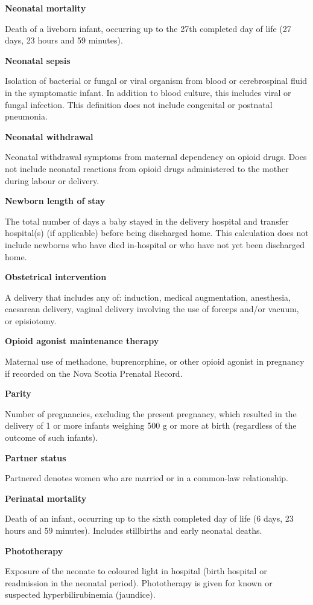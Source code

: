 \documentclass[
]{krantz}
\begin{document}
\textbf{Neonatal mortality}

Death of a liveborn infant, occurring up to the 27th completed day of life (27 days, 23 hours and 59 minutes).

\textbf{Neonatal sepsis}

Isolation of bacterial or fungal or viral organism from blood or cerebrospinal fluid in the symptomatic infant. In addition to blood culture, this includes viral or fungal infection. This definition does not include congenital or postnatal pneumonia.

\textbf{Neonatal withdrawal}

Neonatal withdrawal symptoms from maternal dependency on opioid drugs. Does not include neonatal reactions from opioid drugs administered to the mother during labour or delivery.

\textbf{Newborn length of stay}

The total number of days a baby stayed in the delivery hospital and transfer hospital(s) (if applicable) before being discharged home. This calculation does not include newborns who have died in-hospital or who have not yet been discharged home.

\textbf{Obstetrical intervention}

A delivery that includes any of: induction, medical augmentation, anesthesia, caesarean delivery, vaginal delivery involving the use of forceps and/or vacuum, or episiotomy.

\textbf{Opioid agonist maintenance therapy}

Maternal use of methadone, buprenorphine, or other opioid agonist in pregnancy if recorded on the Nova Scotia Prenatal Record.

\textbf{Parity}

Number of pregnancies, excluding the present pregnancy, which resulted in the delivery of 1 or more infants weighing 500 g or more at birth (regardless of the outcome of such infants).

\textbf{Partner status}

Partnered denotes women who are married or in a common-law relationship.

\textbf{Perinatal mortality}

Death of an infant, occurring up to the sixth completed day of life (6 days, 23 hours and 59 minutes). Includes stillbirths and early neonatal deaths.

\textbf{Phototherapy}

Exposure of the neonate to coloured light in hospital (birth hospital or readmission in the neonatal period). Phototherapy is given for known or suspected hyperbilirubinemia (jaundice).
\end{document}
